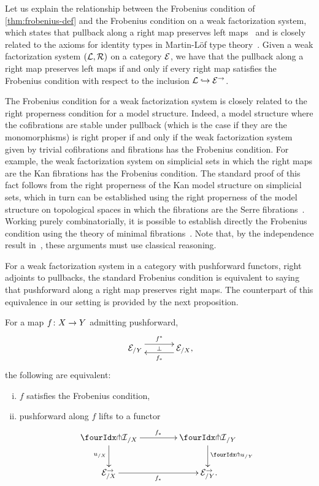 \documentclass[reqno,10pt,a4paper,oneside,draft]{amsart}
\begin{document}
Let us explain the relationship between the Frobenius condition of \cref{thm:frobenius-def} and the Frobenius condition on a weak factorization system, which states that pullback along a right map preserves left maps~\cite{garner:types-omega-groupoids,garner:topological-simplicial} and is closely related to the axioms for identity types in Martin-L\"of type theory~\cite{gambino-garner:idtypewfs}.
Given a weak factorization system $(\cal{L}, \cal{R})$ on a category $\catE$, we have that the pullback along a right map preserves left maps if and only if every right map satisfies the Frobenius condition with respect to the inclusion $\cal{L} \hookrightarrow \catE^\to$.

\begin{remark}
The Frobenius condition for a weak factorization system is closely related to the right properness condition for a model structure.
Indeed, a model structure where the cofibrations are stable under pullback (which is the case if they are the monomorphisms) is right proper if and only if the weak factorization system given by trivial cofibrations and fibrations has the Frobenius condition.
For example, the weak factorization system on simplicial sets in which the right maps are the Kan fibrations has the Frobenius condition.
The standard proof of this fact follows from the right properness of the Kan model structure on simplicial sets, which in turn can be established using the right properness of the model structure on topological spaces in which the fibrations are the Serre fibrations~\cite[Theorem~13.1.13]{hirschhorn-model-localizations}.
Working purely combinatorially, it is possible to establish directly the Frobenius condition using the theory of minimal fibrations~\cite[Theorem~1.7.1]{joyal-tierney-notes}.
Note that, by the independence result in~\cite{coquand-non-constructivity-kan}, these arguments must use classical reasoning.
\end{remark}

For a weak factorization system in a category with pushforward functors, \ie right adjoints to pullbacks, the standard Frobenius condition is equivalent to saying that pushforward along a right map preserves right maps.
The counterpart of this equivalence in our setting is provided by the next proposition.

\begin{proposition} \label{lift-dependent-product}
For a map $f \co X \to Y$ admitting pushforward,
\[
\xymatrix@C+1em{
  \catE_{/Y}
  \ar@<5pt>[r]^{f^*}
  \ar@{}[r]|{\bot}
&
  \catE_{/X}
  \ar@<5pt>[l]^{f_*}
\rlap{,}}
\]
the following are equivalent:
\begin{enumerate}[(i)]
\item $f$ satisfies the Frobenius condition,
\item pushforward along $f$ lifts to a functor
\[
\xymatrix@C=1.5cm{
  {\liftr{\cal{I}}}_{/X}
  \ar[r]^{f_*}
  \ar[d]_{u_{/X}}
&
  {\liftr{\cal{I}}}_{/Y}
  \ar[d]^{{\liftr{u}}_{/Y}}
\\
  \catE_{/X}^\to
  \ar[r]_{f_*}
&
  \catE_{/Y}^\to
\rlap{.}}
\]

\end{enumerate}
\end{proposition}
\end{document}
